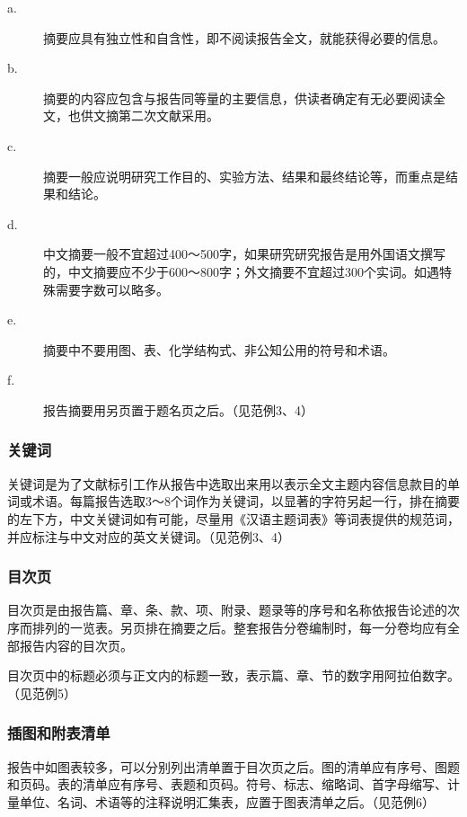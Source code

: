 \begin{description}

\item[a.] 摘要应具有独立性和自含性，即不阅读报告全文，就能获得必要的信息。

\item[b.] 摘要的内容应包含与报告同等量的主要信息，供读者确定有无必要阅读全文，也供文摘第二次文献采用。

\item[c.] 摘要一般应说明研究工作目的、实验方法、结果和最终结论等，而重点是结果和结论。

\item[d.] 中文摘要一般不宜超过400～500字，如果研究研究报告是用外国语文撰写的，中文摘要应不少于600～800字；外文摘要不宜超过300个实词。如遇特殊需要字数可以略多。

\item[e.] 摘要中不要用图、表、化学结构式、非公知公用的符号和术语。

\item[f.] 报告摘要用另页置于题名页之后。（见范例3、4）

\end{description}


\subsubsection{关键词}

关键词是为了文献标引工作从报告中选取出来用以表示全文主题内容信息款目的单词或术语。每篇报告选取3～8个词作为关键词，以显著的字符另起一行，排在摘要的左下方，中文关键词如有可能，尽量用《汉语主题词表》等词表提供的规范词，并应标注与中文对应的英文关键词。（见范例3、4）


\subsubsection{目次页}

目次页是由报告篇、章、条、款、项、附录、题录等的序号和名称依报告论述的次序而排列的一览表。另页排在摘要之后。整套报告分卷编制时，每一分卷均应有全部报告内容的目次页。

目次页中的标题必须与正文内的标题一致，表示篇、章、节的数字用阿拉伯数字。（见范例5）


\subsubsection{插图和附表清单}

报告中如图表较多，可以分别列出清单置于目次页之后。图的清单应有序号、图题和页码。表的清单应有序号、表题和页码。符号、标志、缩略词、首字母缩写、计量单位、名词、术语等的注释说明汇集表，应置于图表清单之后。（见范例6）


